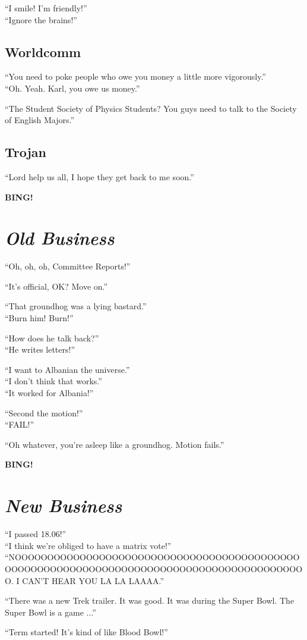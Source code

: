 \documentclass[10pt]{article}
\newcommand{\bing}{{\bf BING!} }
\newcommand{\goto}[1]{\bing \vskip 12pt \section*{{\em{#1}}}}
\begin{document}
``I smile!  I'm friendly!''\\
``Ignore the brains!''\\

\subsection*{Worldcomm}

``You need to poke people who owe you money a little more vigorously.''\\
``Oh. Yeah.  Karl, you owe us money.''

``The Student Society of Physics Students?  You guys need to talk to
the Society of English Majors.''

\subsection*{Trojan}

``Lord help us all, I hope they get back to me soon.''

\goto{Old Business}

``Oh, oh, oh, Committee Reports!''

``It's official, OK?  Move on.''

``That groundhog was a lying bastard.''\\
``Burn him!  Burn!''

``How does he talk back?''\\
``He writes letters!''

``I want to Albanian the universe.''\\
``I don't think that works.''\\
``It worked for Albania!''

``Second the motion!''\\
``FAIL!''

``Oh whatever, you're asleep like a groundhog.  Motion fails.''

\goto{New Business}

``I passed 18.06!''\\
``I think we're obliged to have a matrix vote!''\\
``NOOOOOOOOOOOOOOOOOOOOOOOOOOOOOOOOOOOOOOOOOOOOOOOOOOOOOOOOOOOOOOOOOOOOOOOOOOOOOOOOOOOOOOOOOOO. I
CAN'T HEAR YOU LA LA LAAAA.''

``There was a new Trek trailer.  It was good.  It was during the Super
Bowl.  The Super Bowl is a game ...''

``Term started!  It's kind of like Blood Bowl!''
\end{document}
